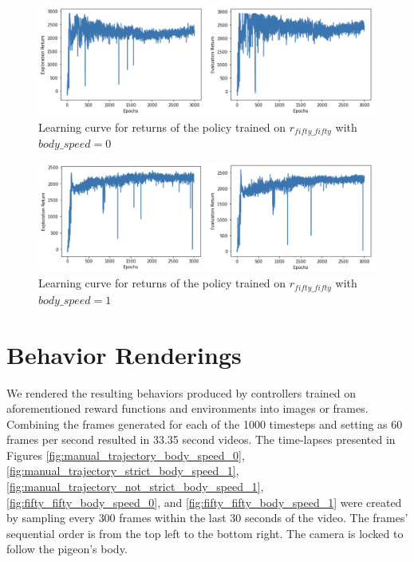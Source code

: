   \begin{figure}[H]
      \centering
      \includegraphics[width=1\textwidth]{figures/learning_curves/fifty_fifty_bs_0.png}
      \caption{Learning curve for returns of the policy trained on $r_{fifty\_fifty}$ with $body\_speed = 0$}
      \label{fig:learning_rate_fifty_fifty_bs_0}
  \end{figure}

  \begin{figure}[H]
      \centering
      \includegraphics[width=1\textwidth]{figures/learning_curves/fifty_fifty_bs_1.png}
      \caption{Learning curve for returns of the policy trained on $r_{fifty\_fifty}$ with $body\_speed = 1$}
      \label{fig:learning_rate_fifty_fifty_bs_1}
  \end{figure}



\section{Behavior Renderings}
  We rendered the resulting behaviors produced by controllers trained on aforementioned reward functions and environments into images or frames.
  Combining the frames generated for each of the 1000 timesteps and setting as 60 frames per second resulted in 33.35 second videos.
  The time-lapses presented in Figures \ref{fig:manual_trajectory_body_speed_0}, \ref{fig:manual_trajectory_strict_body_speed_1}, \ref{fig:manual_trajectory_not_strict_body_speed_1}, \ref{fig:fifty_fifty_body_speed_0}, and \ref{fig:fifty_fifty_body_speed_1} were created by sampling every $300$ frames within the last 30 seconds of the video.
  The frames' sequential order is from the top left to the bottom right.
  The camera is locked to follow the pigeon's body.

